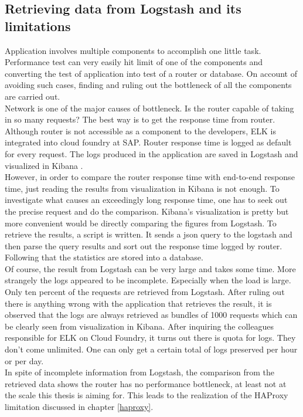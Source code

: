 \subsection{Retrieving data from Logstash and its limitations}
Application involves multiple components to accomplish one little task. Performance test can very easily hit limit of one of the components and converting the test of application into test of a router or database. On account of avoiding such cases, finding and ruling out the bottleneck of all the components are carried out. \\
Network is one of the major causes of bottleneck. Is the router capable of taking in so many requests? The best way is to get the response time from router. Although router is not accessible as a component to the developers, \ac{ELK} \citep{ELK} is integrated into cloud foundry at SAP. Router response time is logged as default for every request. The logs produced in the application are saved in Logstash\citep{Logstash} and visualized in Kibana \citep{Kibana}. \\ 
However, in order to compare the router response time with end-to-end response time, just reading the results from visualization in Kibana is not enough. To investigate what causes an exceedingly long response time, one has to seek out the precise request and do the comparison. Kibana's visualization is pretty but more convenient would be directly comparing the figures from Logstash. To retrieve the results, a script is written. It sends a json query to the logstash and then parse the query results and sort out the response time logged by router. Following that the statistics are stored into a database.\\
Of course, the result from Logstash can be very large and takes some time. More strangely the logs appeared to be incomplete. Especially when the load is large. Only ten percent of the requests are retrieved from Logstash. After ruling out there is anything wrong with the application that retrieves the result, it is observed that the logs are always retrieved as bundles of 1000 requests which can be clearly seen from visualization in Kibana. After inquiring the colleagues responsible for ELK on Cloud Foundry,  it turns out there is quota for logs. They don't come unlimited. One can only get a certain total of logs preserved per hour or per day.\\
In spite of incomplete information from Logstash, the comparison from the retrieved data shows the router has no performance bottleneck, at least not at the scale this thesis is aiming for. This leads to the realization of the HAProxy limitation discussed in chapter \ref{haproxy}. 

